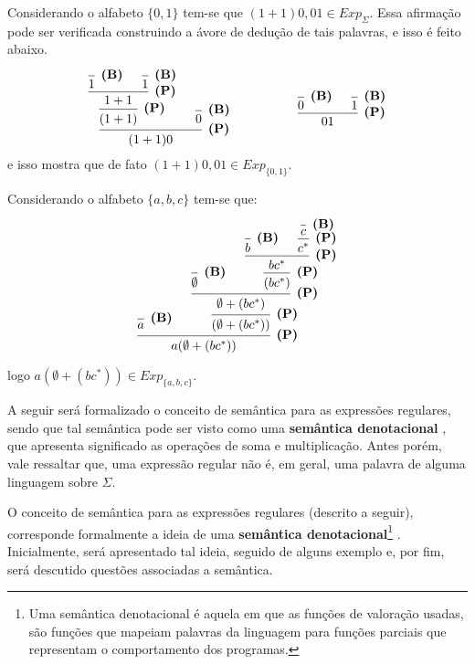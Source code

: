 \begin{exemplo}
	Considerando o alfabeto $\{0,1\}$ tem-se que $(1 + 1)0, 01 \in Exp_\Sigma$. Essa afirmação pode ser verificada construindo a ávore de dedução de tais palavras, e isso é feito abaixo.

	\[
	\begin{prooftree}
		\hypo{ }
		\infer1[\textbf{(B)}]{ 1 }
		\hypo{ }
		\infer1[\textbf{(B)}]{ 1 }
		\infer2[\textbf{(P)}]{ 1 + 1 }
		\infer1[\textbf{(P)}]{ (1 + 1) }
		\hypo{ }
		\infer1[\textbf{(B)}]{ 0 }
		\infer2[\textbf{(P)}]{ (1 + 1)0 }
	\end{prooftree}
	\quad 
	\ \ \ \ \ \ \ \ \ \
	\quad 
	\begin{prooftree}
		\hypo{ }
		\infer1[\textbf{(B)}]{ 0 }
		\hypo{ }
		\infer1[\textbf{(B)}]{ 1 }
		\infer2[\textbf{(P)}]{ 01 }
	\end{prooftree}
	\]
	e isso mostra que de fato $(1 + 1)0, 01 \in Exp_{\{0,1\}}$.
\end{exemplo}

\begin{exemplo}
	Considerando o alfabeto $\{a, b, c\}$ tem-se que:

	\[
		\begin{prooftree}
			\hypo{ }
			\infer1[\textbf{(B)}]{ a }
			\hypo{ }
			\infer1[\textbf{(B)}]{ \emptyset }
			\hypo{ }
			\infer1[\textbf{(B)}]{ b }
			\hypo{ }
			\infer1[\textbf{(B)}]{ c }
			\infer1[\textbf{(P)}]{ c^* }
			\infer2[\textbf{(P)}]{ bc^* }
			\infer1[\textbf{(P)}]{ (bc^*) }
			\infer2[\textbf{(P)}]{ \emptyset + (bc^*) }
			\infer1[\textbf{(P)}]{ (\emptyset + (bc^*)) }
			\infer2[\textbf{(P)}]{ a(\emptyset + (bc^*)) }
		\end{prooftree}
	\]

	logo $a(\emptyset + (bc^*)) \in Exp_{\{a, b, c\}}$.
\end{exemplo}

A seguir será formalizado o conceito de semântica para as expressões regulares, sendo que tal semântica pode ser visto como uma \textbf{semântica denotacional} \cite{scott1971}, que apresenta significado as operações de soma e multiplicação. Antes porém, vale ressaltar que, uma expressão regular não é, em geral, uma palavra de alguma linguagem sobre $\Sigma$.

O conceito de semântica para as expressões regulares (descrito a seguir), corresponde formalmente a ideia de uma \textbf{semântica denotacional}\footnote{Uma semântica denotacional é aquela em que as funções de valoração usadas, são funções que mapeiam palavras da linguagem para funções parciais que representam o comportamento dos programas.} \cite{scott1971}. Inicialmente, será apresentado tal ideia, seguido de alguns exemplo e, por fim, será descutido questões associadas a semântica.

